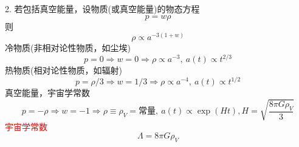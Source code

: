 \documentclass[12pt,a4paper]{article}
\begin{document}
2. 若包括真空能量，设物质(或真空能量)的物态方程
\begin{equation}
p = w \rho
\end{equation}
则
\begin{equation}
\rho \propto a^{-3(1+w)}
\end{equation}
冷物质(非相对论性物质，如尘埃)
\begin{equation}
p = 0 \Rightarrow w = 0 \Rightarrow \rho \propto a^{-3}, ~a(t) \propto t^{2/3}
\end{equation}
热物质(相对论性物质，如辐射)
\begin{equation}
p = \rho/3 \Rightarrow w = 1/3 \Rightarrow \rho \propto a^{-4}, ~a(t) \propto t^{1/2}
\end{equation}
真空能量，宇宙学常数
\begin{equation}
p = -\rho \Rightarrow w = -1 \Rightarrow \rho \equiv \rho_V = \text{常量}, ~a(t) \propto \exp(Ht), H = \sqrt{\frac{8\pi G\rho_V}{3}}
\end{equation}
\textcolor{red}{宇宙学常数}
\begin{equation}
\Lambda = 8\pi G\rho_V
\end{equation}
\end{document}

